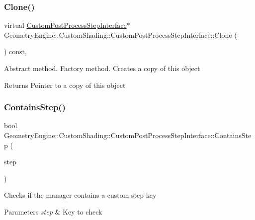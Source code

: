 \subsubsection{\texorpdfstring{Clone()}{Clone()}}
{\footnotesize\ttfamily virtual \mbox{\hyperlink{class_geometry_engine_1_1_custom_shading_1_1_custom_post_process_step_interface}{Custom\+Post\+Process\+Step\+Interface}}$\ast$ Geometry\+Engine\+::\+Custom\+Shading\+::\+Custom\+Post\+Process\+Step\+Interface\+::\+Clone (\begin{DoxyParamCaption}{ }\end{DoxyParamCaption}) const\hspace{0.3cm}{\ttfamily [inline]}, {\ttfamily [virtual]}}

Abstract method. Factory method. Creates a copy of this object \begin{DoxyReturn}{Returns}
Pointer to a copy of this object 
\end{DoxyReturn}
\mbox{\label{class_geometry_engine_1_1_custom_shading_1_1_custom_post_process_step_interface_a1888cd07ad0378965709a3356f17f2db}} 
\subsubsection{\texorpdfstring{ContainsStep()}{ContainsStep()}}
{\footnotesize\ttfamily bool Geometry\+Engine\+::\+Custom\+Shading\+::\+Custom\+Post\+Process\+Step\+Interface\+::\+Contains\+Step (\begin{DoxyParamCaption}\item[{\mbox{\hyperlink{namespace_geometry_engine_1_1_custom_shading_a09e44ca81de5fe08c6d50271d680c4b1}{Custom\+Post\+Process\+Steps}}}]{step }\end{DoxyParamCaption})\hspace{0.3cm}{\ttfamily [inline]}}

Checks if the manager contains a custom step key 
\begin{DoxyParams}{Parameters}
{\em step} & Key to check \\
\hline
\end{DoxyParams}
\mbox{\label{class_geometry_engine_1_1_custom_shading_1_1_custom_post_process_step_interface_a9ae01d12255b61cdeb0a1b2e6d9cf785}} 
